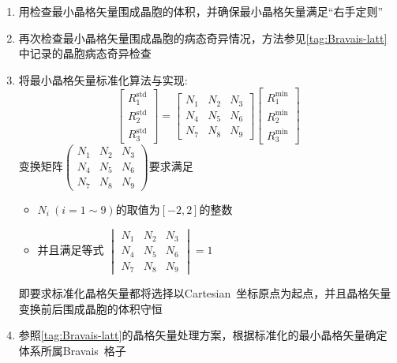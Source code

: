 \documentclass{article}      %
\begin{document}
\begin{enumerate}
				\begin{enumerate}
					\item 用检查最小晶格矢量围成晶胞的体积，并确保最小晶格矢量满足“右手定则”
					\item 再次检查最小晶格矢量围成晶胞的病态奇异情况，方法参见\ref{tag:Bravais-latt}中记录的晶胞病态奇异检查
					\item 将最小晶格矢量标准化算法与实现:~
						\begin{displaymath}
							\begin{bmatrix}
								R_1^{\mathrm{std}}\\
								R_2^{\mathrm{std}}\\
								R_3^{\mathrm{std}}
							\end{bmatrix}
							= \begin{bmatrix}
									N_1 &N_2 &N_3\\
								N_4 &N_5 &N_6\\
								N_7 &N_8 &N_9
								\end{bmatrix}
								\begin{bmatrix}
									R_1^{\mathrm{min}}\\
								R_2^{\mathrm{min}}\\
								R_3^{\mathrm{min}}
								\end{bmatrix}
						\end{displaymath}
						变换矩阵$\begin{pmatrix}
									N_1 &N_2 &N_3\\
								N_4 &N_5 &N_6\\
								N_7 &N_8 &N_9
								\end{pmatrix}$要求满足
								\begin{itemize}
									\item $N_i~(i=1\sim9)$的取值为$[-2,2]$的整数
									\item 并且满足等式 $\begin{vmatrix}
									N_1 &N_2 &N_3\\
								N_4 &N_5 &N_6\\
								N_7 &N_8 &N_9
								\end{vmatrix}=1$
								\end{itemize}
								即要求标准化晶格矢量都将选择以\textrm{Cartesian~}坐标原点为起点，并且晶格矢量变换前后围成晶胞的体积守恒
			\item 参照\ref{tag:Bravais-latt}的晶格矢量处理方案，根据标准化的最小晶格矢量确定体系所属\textrm{Bravais~}格子
				\begin{enumerate}

\end{enumerate}
\end{enumerate}
\end{enumerate}
\end{document}
